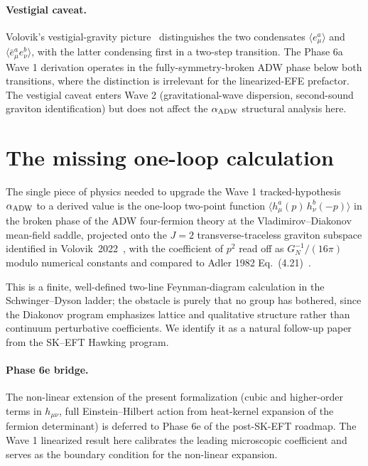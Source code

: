 \documentclass[aps,prd,twocolumn,showpacs,superscriptaddress,nofootinbib]{revtex4-2}
\newcommand{\aADW}{\alpha_{\rm ADW}}
\begin{document}
\paragraph*{Vestigial caveat.}
Volovik's vestigial-gravity picture~\cite{Volovik2024Vestigial}
distinguishes the two condensates $\langle e^{a}_{\mu}\rangle$
and $\langle \bar{e}^{a}_{\mu} e^{b}_{\nu}\rangle$, with the latter
condensing first in a two-step transition. The Phase 6a Wave 1
derivation operates in the fully-symmetry-broken ADW phase below
both transitions, where the distinction is irrelevant for the
linearized-EFE prefactor. The vestigial caveat enters Wave 2
(gravitational-wave dispersion, second-sound graviton identification)
but does not affect the $\aADW$ structural analysis here.

\section{The missing one-loop calculation}
\label{sec:open-computation}

The single piece of physics needed to upgrade the Wave 1
tracked-hypothesis $\aADW$ to a derived value is the one-loop
two-point function
$\langle h^{a}_{\mu}(p)\,h^{b}_{\nu}(-p)\rangle$ in the broken
phase of the ADW four-fermion theory at the
Vladimirov--Diakonov mean-field saddle, projected onto the
$J=2$ transverse-traceless graviton subspace identified in
Volovik~2022~\cite{Volovik2022Counting}, with the coefficient
of $p^{2}$ read off as $G_{N}^{-1}/(16\pi)$ modulo numerical
constants and compared to Adler 1982 Eq.~(4.21)~\cite{Adler1982}.

This is a finite, well-defined two-line Feynman-diagram calculation
in the Schwinger--Dyson ladder; the obstacle is purely that no
group has bothered, since the Diakonov program emphasizes lattice
and qualitative structure rather than continuum perturbative
coefficients. We identify it as a natural follow-up paper from
the SK--EFT Hawking program.

\paragraph*{Phase 6e bridge.}
The non-linear extension of the present formalization (cubic and
higher-order terms in $h_{\mu\nu}$, full Einstein--Hilbert
action from heat-kernel expansion of the fermion determinant)
is deferred to Phase 6e of the post-SK-EFT roadmap. The Wave 1
linearized result here calibrates the leading microscopic
coefficient and serves as the boundary condition for the
non-linear expansion.
\end{document}
